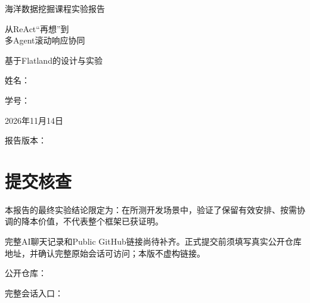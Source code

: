 \documentclass[TwoSide=false,Degree=graduate,GradLevel=master,Type=thesis,Period=final,Language=chinese,MajorFormat=general,Title={从ReAct再想到多Agent滚动响应协同},TitleEng={Rolling Coordination for Multi-Agent Systems},StudentName={待填写},StudentID={待填写},SubmitDate={2026年11月14日}]{zjuthesis}
\begin{document}
\begin{titlepage}
\centering
\vspace*{2cm}
{\heiti 海洋数据挖掘课程实验报告\par}
\vspace{2cm}
{\heiti 从ReAct“再想”到\\多Agent滚动响应协同\par}
\vspace{0.8cm}
{ 基于Flatland的设计与实验\par}
\vspace{2cm}
{ 姓名：\underline{\hspace{4cm}}\par}
\vspace{0.5cm}
{ 学号：\underline{\hspace{4cm}}\par}
\vfill
{ 2026年11月14日\par}
\vspace{0.4cm}
{ 报告版本：\ReportVersion\par}
\end{titlepage}
\chapter*{提交核查}
本报告的最终实验结论限定为：在所测开发场景中，验证了保留有效安排、按需协调的降本价值，不代表整个框架已获证明。

完整AI聊天记录和Public GitHub链接尚待补齐。正式提交前须填写真实公开仓库地址，并确认完整原始会话可访问；本版不虚构链接。

公开仓库：\underline{\hspace{10cm}}

完整会话入口：\underline{\hspace{9cm}}
\tableofcontents
\clearpage

\end{document}
